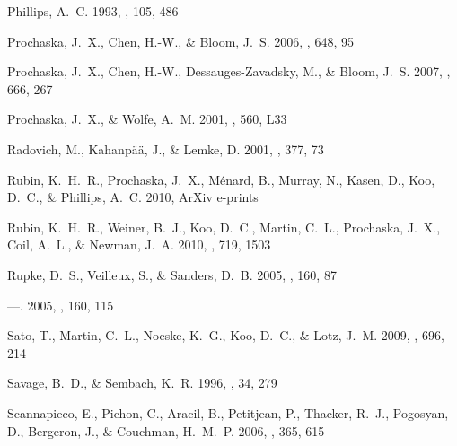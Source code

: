 \documentclass[]{emulateapj}
\begin{document}
\begin{thebibliography}{74}
{Phillips}, A.~C. 1993, \aj, 105, 486

{Prochaska}, J.~X., {Chen}, H.-W., \& {Bloom}, J.~S. 2006, \apj, 648, 95

{Prochaska}, J.~X., {Chen}, H.-W., {Dessauges-Zavadsky}, M., \& {Bloom}, J.~S.
  2007, \apj, 666, 267

{Prochaska}, J.~X., \& {Wolfe}, A.~M. 2001, \apjl, 560, L33

{Radovich}, M., {Kahanp{\"a}{\"a}}, J., \& {Lemke}, D. 2001, \aap, 377, 73

{Rubin}, K.~H.~R., {Prochaska}, J.~X., {M{\'e}nard}, B., {Murray}, N., {Kasen},
  D., {Koo}, D.~C., \& {Phillips}, A.~C. 2010{}, ArXiv e-prints

{Rubin}, K.~H.~R., {Weiner}, B.~J., {Koo}, D.~C., {Martin}, C.~L., {Prochaska},
  J.~X., {Coil}, A.~L., \& {Newman}, J.~A. 2010{}, \apj, 719, 1503

{Rupke}, D.~S., {Veilleux}, S., \& {Sanders}, D.~B. 2005{}, \apjs,
  160, 87

---. 2005{}, \apjs, 160, 115

{Sato}, T., {Martin}, C.~L., {Noeske}, K.~G., {Koo}, D.~C., \& {Lotz}, J.~M.
  2009, \apj, 696, 214

{Savage}, B.~D., \& {Sembach}, K.~R. 1996, \araa, 34, 279

{Scannapieco}, E., {Pichon}, C., {Aracil}, B., {Petitjean}, P., {Thacker},
  R.~J., {Pogosyan}, D., {Bergeron}, J., \& {Couchman}, H.~M.~P. 2006, \mnras,
  365, 615


\end{thebibliography}
\end{document}

